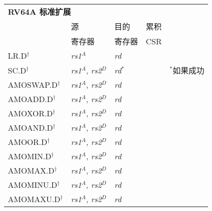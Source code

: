 \begin{tabular}{p{3cm}|p{3cm}|p{2cm}|p{4cm}|p{4cm}}
  \multicolumn{4}{l}{\bf RV64A 标准扩展} \\
  \cline{2-4}
    & 源    & 目的 & 累积 \\
    & 寄存器 & 寄存器   & CSR \\
  \cline{2-4}
   LR.D$^\dagger$ & {\em rs1}$^A$ & {\em rd} &   & \\
   \cline{2-4}
   SC.D$^\dagger$ & {\em rs1}$^A$, {\em rs2}$^D$ & {\em rd}$^*$ & & $^*$如果成功  \\
   \cline{2-4}
   AMOSWAP.D$^\dagger$ & {\em rs1}$^A$, {\em rs2}$^D$ & {\em rd} &   & \\
   \cline{2-4}
   AMOADD.D$^\dagger$ & {\em rs1}$^A$, {\em rs2}$^D$ & {\em rd} &   & \\
   \cline{2-4}
   AMOXOR.D$^\dagger$ & {\em rs1}$^A$, {\em rs2}$^D$ & {\em rd} &   & \\
   \cline{2-4}
   AMOAND.D$^\dagger$ & {\em rs1}$^A$, {\em rs2}$^D$ & {\em rd} &   & \\
   \cline{2-4}
   AMOOR.D$^\dagger$ & {\em rs1}$^A$, {\em rs2}$^D$ & {\em rd} &   & \\
   \cline{2-4}
   AMOMIN.D$^\dagger$ & {\em rs1}$^A$, {\em rs2}$^D$ & {\em rd} &   & \\
   \cline{2-4}
   AMOMAX.D$^\dagger$ & {\em rs1}$^A$, {\em rs2}$^D$ & {\em rd} &   & \\
   \cline{2-4}
   AMOMINU.D$^\dagger$ & {\em rs1}$^A$, {\em rs2}$^D$ & {\em rd} &   & \\
   \cline{2-4}
   AMOMAXU.D$^\dagger$ & {\em rs1}$^A$, {\em rs2}$^D$ & {\em rd} &   & \\
   \cline{2-4}
\end{tabular}

